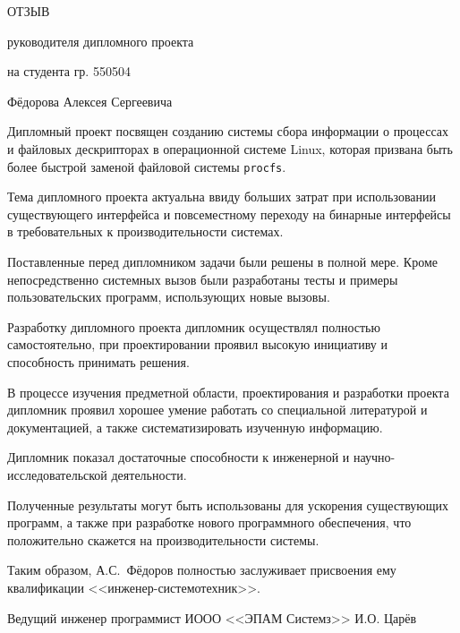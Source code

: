 


\centerline{ОТЗЫВ}
\centerline{руководителя дипломного проекта}
\centerline{на студента гр. 550504}
\centerline{Фёдорова Алексея Сергеевича}
\vspace{\baselineskip}

Дипломный проект посвящен созданию системы сбора информации о процессах и
файловых дескрипторах в операционной системе Linux, которая призвана быть более
быстрой заменой файловой системы \texttt{procfs}.

Тема дипломного проекта актуальна ввиду больших затрат при использовании
существующего интерфейса и повсеместному переходу на бинарные интерфейсы в
требовательных к производительности системах.

Поставленные перед дипломником задачи были решены в полной мере. Кроме
непосредственно системных вызов были разработаны тесты и примеры
пользовательских программ, использующих новые вызовы.

Разработку дипломного проекта дипломник осуществлял полностью самостоятельно, при
проектировании проявил высокую инициативу и способность принимать решения.

В процессе изучения предметной области, проектирования и разработки проекта
дипломник проявил хорошее умение работать со специальной литературой и
документацией, а также систематизировать изученную информацию.

Дипломник показал достаточные способности к инженерной и
научно-исследовательской деятельности.

Полученные результаты могут быть использованы для ускорения существующих
программ, а также при разработке нового программного обеспечения, что
положительно скажется на производительности системы.

Таким образом, А.С.~Фёдоров полностью заслуживает присвоения ему квалификации
<<инженер-системотехник>>.

\vspace{\baselineskip}
\noindent
Ведущий инженер программист ИООО <<ЭПАМ Системз>> \hfill И.О. Царёв


